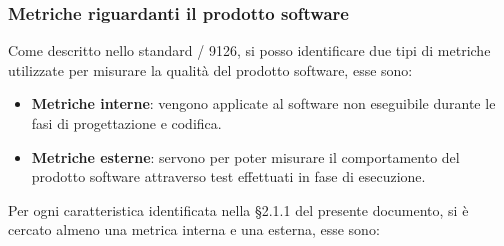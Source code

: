     \subsubsection{Metriche riguardanti il prodotto software}
    Come descritto nello standard / 9126, si posso identificare due tipi di metriche utilizzate per misurare la qualità del prodotto software, esse sono:
    \begin{itemize}
      \item \textbf{Metriche interne}: vengono applicate al software non eseguibile durante le fasi di progettazione e codifica.
      \item \textbf{Metriche esterne}: servono per poter misurare il comportamento del prodotto software attraverso test effettuati in fase di esecuzione.
    \end{itemize}
    Per ogni caratteristica identificata nella \S2.1.1 del presente documento, si è cercato almeno una metrica interna e una esterna, esse sono:
